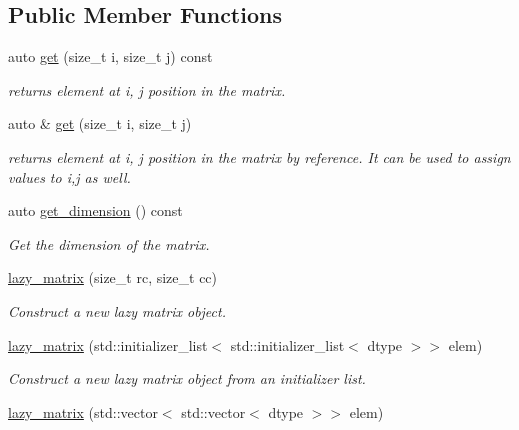\subsection*{Public Member Functions}
\begin{DoxyCompactItemize}
\item 
auto \mbox{\hyperlink{classboost_1_1test_1_1lazy__matrix_ab974b4c433023bc7bde645cb3fdfe592}{get}} (size\+\_\+t i, size\+\_\+t j) const
\begin{DoxyCompactList}\small\item\em returns element at i, j position in the matrix. \end{DoxyCompactList}\item 
auto \& \mbox{\hyperlink{classboost_1_1test_1_1lazy__matrix_af15683b4f6c83dfb4384c73f5863890b}{get}} (size\+\_\+t i, size\+\_\+t j)
\begin{DoxyCompactList}\small\item\em returns element at i, j position in the matrix by reference. It can be used to assign values to i,j as well. \end{DoxyCompactList}\item 
auto \mbox{\hyperlink{classboost_1_1test_1_1lazy__matrix_abd183543f6cd5e26c70bb14e5df7e904}{get\+\_\+dimension}} () const
\begin{DoxyCompactList}\small\item\em Get the dimension of the matrix. \end{DoxyCompactList}\item 
\mbox{\hyperlink{classboost_1_1test_1_1lazy__matrix_ad3a6c255f2b37a1a48a1780cd79e94db}{lazy\+\_\+matrix}} (size\+\_\+t rc, size\+\_\+t cc)
\begin{DoxyCompactList}\small\item\em Construct a new lazy matrix object. \end{DoxyCompactList}\item 
\mbox{\hyperlink{classboost_1_1test_1_1lazy__matrix_aeef69d0d1de7f09a34ba3110224f9579}{lazy\+\_\+matrix}} (std\+::initializer\+\_\+list$<$ std\+::initializer\+\_\+list$<$ dtype $>$$>$ elem)
\begin{DoxyCompactList}\small\item\em Construct a new lazy matrix object from an initializer list. \end{DoxyCompactList}\item 
\mbox{\hyperlink{classboost_1_1test_1_1lazy__matrix_a46c807d6ff20651daf91e4d1e41d07aa}{lazy\+\_\+matrix}} (std\+::vector$<$ std\+::vector$<$ dtype $>$$>$ elem)

\end{DoxyCompactItemize}
